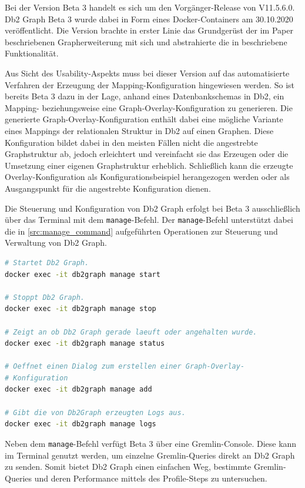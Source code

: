 Bei der Version Beta 3 handelt es sich um den Vorgänger-Release von V11.5.6.0. Db2 Graph Beta 3 wurde dabei in Form eines Docker-Containers am 30.10.2020 veröffentlicht. Die Version brachte in erster Linie das Grundgerüst der im Paper \cite{sigmod_tian} beschriebenen Grapherweiterung mit sich und abstrahierte die in \cite{sigmod_tian} beschriebene Funktionalität. 

Aus Sicht des Usability-Aspekts muss bei dieser Version auf das automatisierte Verfahren der Erzeugung der Mapping-Konfiguration hingewiesen werden. So ist bereits Beta 3 dazu in der Lage, anhand eines Datenbankschemas in Db2, ein Mapping- beziehungsweise eine Graph-Overlay-Konfiguration zu generieren. Die generierte Graph-Overlay-Konfiguration enthält dabei eine mögliche Variante eines Mappings der relationalen Struktur in Db2 auf einen Graphen. Diese Konfiguration bildet dabei in den meisten Fällen nicht die angestrebte Graphstruktur ab, jedoch erleichtert und vereinfacht sie das Erzeugen oder die Umsetzung einer eigenen Graphstruktur erheblich. Schließlich kann die erzeugte Overlay-Konfiguration als Konfigurationsbeispiel herangezogen werden oder als Ausgangspunkt für die angestrebte Konfiguration dienen. 

Die Steuerung und Konfiguration von Db2 Graph erfolgt bei Beta 3 ausschließlich über das Terminal mit dem \texttt{manage}-Befehl. Der \texttt{manage}-Befehl unterstützt dabei die in \autoref{src:manage_command} aufgeführten Operationen zur Steuerung und Verwaltung von Db2 Graph. 

\begin{lstlisting}[label=src:manage_command,caption={Beispiel Steuerung und Verwaltung von  Db2 Graph Beta 3},language=BASH]
# Startet Db2 Graph.
docker exec -it db2graph manage start

# Stoppt Db2 Graph.
docker exec -it db2graph manage stop

# Zeigt an ob Db2 Graph gerade laeuft oder angehalten wurde.
docker exec -it db2graph manage status

# Oeffnet einen Dialog zum erstellen einer Graph-Overlay-
# Konfiguration
docker exec -it db2graph manage add

# Gibt die von Db2Graph erzeugten Logs aus.
docker exec -it db2graph manage logs
\end{lstlisting}

Neben dem \texttt{manage}-Befehl verfügt Beta 3 über eine Gremlin-Console. Diese kann im Terminal genutzt werden, um einzelne Gremlin-Queries direkt an Db2 Graph zu senden. Somit bietet Db2 Graph einen einfachen Weg, bestimmte Gremlin-Queries und deren Performance mittels des Profile-Steps zu untersuchen.

